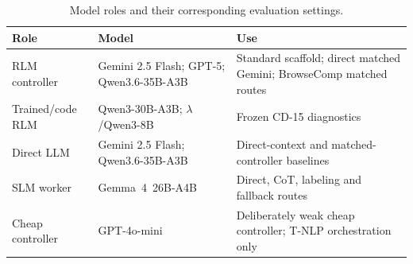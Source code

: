 \documentclass{article}
\begin{document}
\begin{table}[t]
\caption{Model roles and their corresponding evaluation settings.}
\label{tab:model-panel}
\centering
\small
\setlength{\tabcolsep}{3pt}
\begin{tabular}{@{}L{1.95cm}L{2.7cm}L{3.2cm}@{}}
\toprule
\textbf{Role} & \textbf{Model} & \textbf{Use} \\
\midrule
RLM controller & Gemini 2.5 Flash; GPT-5; \mbox{Qwen3.6-35B-A3B} & Standard scaffold; direct matched Gemini; BrowseComp matched routes \\
\addlinespace[3pt]
Trained/code RLM & \mbox{Qwen3-30B-A3B}; \mbox{$\lambda$/Qwen3-8B} & Frozen CD-15 diagnostics \\
\addlinespace[3pt]
Direct LLM & Gemini 2.5 Flash; \mbox{Qwen3.6-35B-A3B} & Direct-context and matched-controller baselines \\
\addlinespace[3pt]
SLM worker & \mbox{Gemma 4 26B-A4B} & Direct, CoT, labeling and fallback routes \\
\addlinespace[3pt]
Cheap controller & GPT-4o-mini & Deliberately weak cheap controller; T-NLP orchestration only \\
\bottomrule
\end{tabular}
\end{table}
\end{document}
